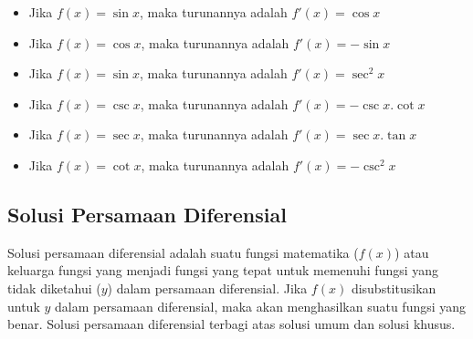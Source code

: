\begin{enumerate}[1.]
\begin{itemize}
			\item Jika \begin{math} f(x) = \sin x \end{math}, maka turunannya adalah \begin{math} f'(x) = \cos x \end{math}
			\item Jika \begin{math} f(x) = \cos x \end{math}, maka turunannya adalah \begin{math} f'(x) = -\sin x \end{math}
			\item Jika \begin{math} f(x) = \sin x \end{math}, maka turunannya adalah \begin{math} f'(x) = \sec^{2} x \end{math}
			\item Jika \begin{math} f(x) = \csc x \end{math}, maka turunannya adalah \begin{math} f'(x) = -\csc x.\cot x \end{math}
			\item Jika \begin{math} f(x) = \sec x \end{math}, maka turunannya adalah \begin{math} f'(x) = \sec x.\tan x \end{math}
			\item Jika \begin{math} f(x) = \cot x \end{math}, maka turunannya adalah \begin{math} f'(x) = -\csc^{2} x \end{math}

		\end{itemize}

\end{enumerate}

\subsection{Solusi Persamaan Diferensial}
\label{sec:solusi}

Solusi persamaan diferensial adalah suatu fungsi matematika (\begin{math} f(x) \end{math}) atau keluarga fungsi yang menjadi fungsi yang tepat untuk memenuhi fungsi yang tidak diketahui (\begin{math} y \end{math}) dalam persamaan diferensial. Jika \begin{math} f(x) \end{math} disubstitusikan untuk \begin{math} y \end{math} dalam persamaan diferensial, maka akan menghasilkan suatu fungsi yang benar. Solusi persamaan diferensial terbagi atas solusi umum dan solusi khusus.

